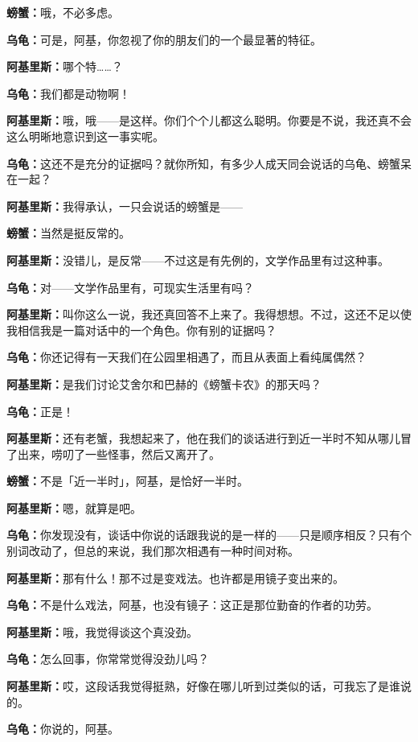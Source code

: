 \documentclass[
  12pt,
  twoside,
  openright,
  oldfontcommands,
]{memoir}
\newcommand{\dialogname}[1]{{\heifamily\bfseries #1}}
\begin{document}
\dialogname{螃蟹：}哦，不必多虑。

\dialogname{乌龟：}可是，阿基，你忽视了你的朋友们的一个最显著的特征。

\dialogname{阿基里斯：}哪个特\ldots\ldots？

\dialogname{乌龟：}我们都是动物啊！

\dialogname{阿基里斯：}哦，哦------是这样。你们个个儿都这么聪明。你要是不说，我还真不会这么明晰地意识到这一事实呢。

\dialogname{乌龟：}这还不是充分的证据吗？就你所知，有多少人成天同会说话的乌龟、螃蟹呆在一起？

\dialogname{阿基里斯：}我得承认，一只会说话的螃蟹是------

\dialogname{螃蟹：}当然是挺反常的。

\dialogname{阿基里斯：}没错儿，是反常------不过这是有先例的，文学作品里有过这种事。

\dialogname{乌龟：}对------文学作品里有，可现实生活里有吗？

\dialogname{阿基里斯：}叫你这么一说，我还真回答不上来了。我得想想。不过，这还不足以使我相信我是一篇对话中的一个角色。你有别的证据吗？

\dialogname{乌龟：}你还记得有一天我们在公园里相遇了，而且从表面上看纯属偶然？

\dialogname{阿基里斯：}是我们讨论艾舍尔和巴赫的《螃蟹卡农》的那天吗？

\dialogname{乌龟：}正是！

\dialogname{阿基里斯：}还有老蟹，我想起来了，他在我们的谈话进行到近一半时不知从哪儿冒了出来，唠叨了一些怪事，然后又离开了。

\dialogname{螃蟹：}不是「近一半时」，阿基，是恰好一半时。

\dialogname{阿基里斯：}嗯，就算是吧。

\dialogname{乌龟：}你发现没有，谈话中你说的话跟我说的是一样的------只是顺序相反？只有个别词改动了，但总的来说，我们那次相遇有一种时间对称。

\dialogname{阿基里斯：}那有什么！那不过是变戏法。也许都是用镜子变出来的。

\dialogname{乌龟：}不是什么戏法，阿基，也没有镜子：这正是那位勤奋的作者的功劳。

\dialogname{阿基里斯：}哦，我觉得谈这个真没劲。

\dialogname{乌龟：}怎么回事，你常常觉得没劲儿吗？

\dialogname{阿基里斯：}哎，这段话我觉得挺熟，好像在哪儿听到过类似的话，可我忘了是谁说的。

\dialogname{乌龟：}你说的，阿基。
\end{document}
